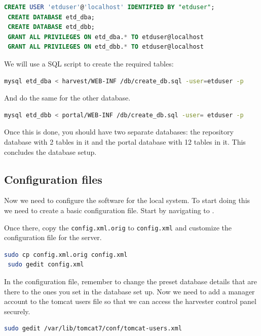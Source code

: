 \documentclass[a4paper,11pt]{article}
\begin{document}
\begin{lstlisting}[language=SQL]
 CREATE USER 'etduser'@'localhost' IDENTIFIED BY "etduser"; 
 CREATE DATABASE etd_dba; 
 CREATE DATABASE etd_dbb; 
 GRANT ALL PRIVILEGES ON etd_dba.* TO etduser@localhost
 GRANT ALL PRIVILEGES ON etd_dbb.* TO etduser@localhost
\end{lstlisting}

We will use a SQL script to create the required tables: 

\begin{lstlisting}[language=bash]
 mysql etd_dba < harvest/WEB-INF /db/create_db.sql -user=etduser -p
\end{lstlisting}

And do the same for the other database. 

\begin{lstlisting}[language=bash]
 mysql etd_dbb < portal/WEB-INF /db/create_db.sql -user= etduser -p
\end{lstlisting}

Once this is done, you should have two separate databases: the repository database with 2 tables in it and the portal database with 12 tables in it. This concludes the database setup.

\subsection{Configuration files}

Now we need to configure the software for the local system. To start doing this we need to create a basic configuration file. Start by navigating to .

Once there, copy the \texttt{config.xml.orig} to \texttt{config.xml} and customize the configuration file for the server. 

\begin{lstlisting}[language=bash]
 sudo cp config.xml.orig config.xml 
 sudo gedit config.xml
\end{lstlisting}

In the configuration file, remember to change the preset database details that are there to the ones you set in the database set up. Now we need to add a manager account to the tomcat users file so that we can access the harvester control panel securely. 

\begin{lstlisting}[language=bash]
 sudo gedit /var/lib/tomcat7/conf/tomcat-users.xml
\end{lstlisting}
\end{document}

